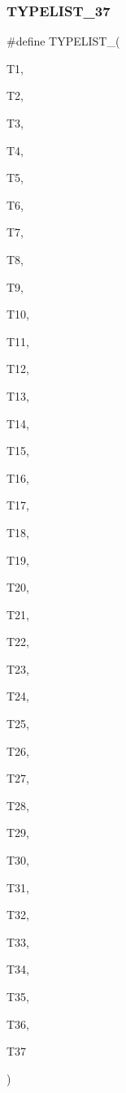 \subsubsection{\texorpdfstring{TYPELIST\_37}{TYPELIST\_37}}
{\footnotesize\ttfamily \#define T\+Y\+P\+E\+L\+I\+S\+T\+\_(\begin{DoxyParamCaption}\item[{}]{T1,  }\item[{}]{T2,  }\item[{}]{T3,  }\item[{}]{T4,  }\item[{}]{T5,  }\item[{}]{T6,  }\item[{}]{T7,  }\item[{}]{T8,  }\item[{}]{T9,  }\item[{}]{T10,  }\item[{}]{T11,  }\item[{}]{T12,  }\item[{}]{T13,  }\item[{}]{T14,  }\item[{}]{T15,  }\item[{}]{T16,  }\item[{}]{T17,  }\item[{}]{T18,  }\item[{}]{T19,  }\item[{}]{T20,  }\item[{}]{T21,  }\item[{}]{T22,  }\item[{}]{T23,  }\item[{}]{T24,  }\item[{}]{T25,  }\item[{}]{T26,  }\item[{}]{T27,  }\item[{}]{T28,  }\item[{}]{T29,  }\item[{}]{T30,  }\item[{}]{T31,  }\item[{}]{T32,  }\item[{}]{T33,  }\item[{}]{T34,  }\item[{}]{T35,  }\item[{}]{T36,  }\item[{}]{T37 }\end{DoxyParamCaption})}

